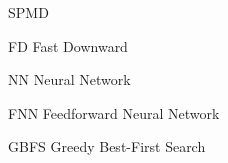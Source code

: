 
\begin{listofabbrv}{SPMD}
    \item[FD] Fast Downward
    \item[NN] Neural Network
    \item[FNN] Feedforward Neural Network
    \item[GBFS] Greedy Best-First Search
\end{listofabbrv}

